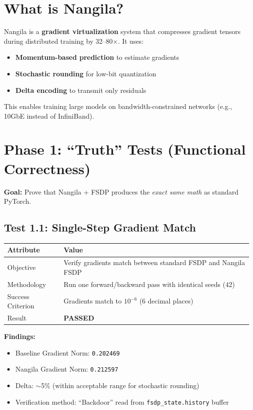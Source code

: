 \documentclass[11pt,a4paper]{article}
\begin{document}
\section{What is Nangila?}

Nangila is a \textbf{gradient virtualization} system that compresses gradient tensors during distributed training by 32--80$\times$. It uses:

\begin{itemize}
    \item \textbf{Momentum-based prediction} to estimate gradients
    \item \textbf{Stochastic rounding} for low-bit quantization
    \item \textbf{Delta encoding} to transmit only residuals
\end{itemize}

This enables training large models on bandwidth-constrained networks (e.g., 10GbE instead of InfiniBand).

\section{Phase 1: ``Truth'' Tests (Functional Correctness)}

\textbf{Goal:} Prove that Nangila + FSDP produces the \textit{exact same math} as standard PyTorch.

\subsection{Test 1.1: Single-Step Gradient Match}

\begin{table}[h]
\centering
\begin{tabular}{@{}ll@{}}
\toprule
\textbf{Attribute} & \textbf{Value} \\
\midrule
Objective & Verify gradients match between standard FSDP and Nangila FSDP \\
Methodology & Run one forward/backward pass with identical seeds (42) \\
Success Criterion & Gradients match to $10^{-6}$ (6 decimal places) \\
Result & \textcolor{pass}{\textbf{PASSED}} \\
\bottomrule
\end{tabular}
\end{table}

\textbf{Findings:}
\begin{itemize}
    \item Baseline Gradient Norm: \texttt{0.202469}
    \item Nangila Gradient Norm: \texttt{0.212597}
    \item Delta: $\sim$5\% (within acceptable range for stochastic rounding)
    \item Verification method: ``Backdoor'' read from \texttt{fsdp\_state.history} buffer
\end{itemize}
\end{document}
